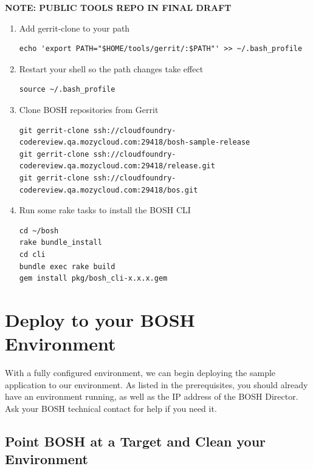 \textbf{NOTE: PUBLIC TOOLS REPO IN FINAL DRAFT}

\begin{enumerate}
\item Add gerrit-clone to your path

\begin{verbatim}
echo 'export PATH="$HOME/tools/gerrit/:$PATH"' >> ~/.bash_profile
\end{verbatim}


\item Restart your shell so the path changes take effect

\begin{verbatim}
source ~/.bash_profile
\end{verbatim}


\item Clone BOSH repositories from Gerrit

\begin{verbatim}
git gerrit-clone ssh://cloudfoundry-codereview.qa.mozycloud.com:29418/bosh-sample-release
git gerrit-clone ssh://cloudfoundry-codereview.qa.mozycloud.com:29418/release.git
git gerrit-clone ssh://cloudfoundry-codereview.qa.mozycloud.com:29418/bos.git
\end{verbatim}


\item Run some rake tasks to install the BOSH CLI

\begin{verbatim}
cd ~/bosh
rake bundle_install
cd cli
bundle exec rake build
gem install pkg/bosh_cli-x.x.x.gem
\end{verbatim}


\end{enumerate}

\section{Deploy to your BOSH Environment}
\label{deploytoyourboshenvironment}

With a fully configured environment, we can begin deploying the sample application to our environment. As listed in the prerequisites, you should already have an environment running, as well as the IP address of the BOSH Director. Ask your BOSH technical contact for help if you need it.

\subsection{Point BOSH at a Target and Clean your Environment}
\label{pointboshatatargetandcleanyourenvironment}

